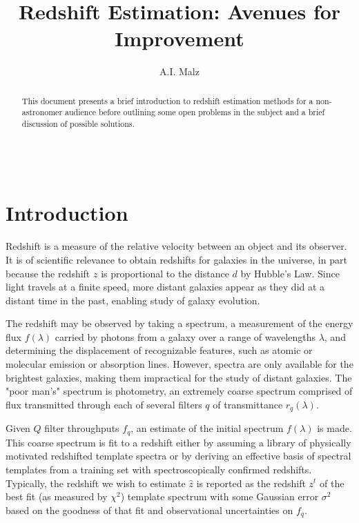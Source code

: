 \documentclass[12pt, onecolumn]{emulateapj}
\begin{document}
\begin{align}
\end{align}

\title{Redshift Estimation: Avenues for Improvement}

\author{A.I. Malz}

\begin{abstract}
This document presents a brief introduction to redshift estimation methods for a non-astronomer audience before outlining some open problems in the subject and a brief discussion of possible solutions.
\end{abstract}


\section{Introduction}
\label{sec:intro}

Redshift is a measure of the relative velocity between an object and its observer.  It is of scientific relevance to obtain redshifts for galaxies in the universe, in part because the redshift $z$ is proportional to the distance $d$ by Hubble's Law.  Since light travels at a finite speed, more distant galaxies appear as they did at a distant time in the past, enabling study of galaxy evolution. 

The redshift may be observed by taking a spectrum, a measurement of the energy flux $f(\lambda)$ carried by photons from a galaxy over a range of wavelengths $\lambda$, and determining the displacement of recognizable features, such as atomic or molecular emission or absorption lines.  However, spectra are only available for the brightest galaxies, making them impractical for the study of distant galaxies.  The "poor man's" spectrum is photometry, an extremely coarse spectrum comprised of flux transmitted through each of several filters $q$ of transmittance $r_{q}(\lambda)$.

Given $Q$ filter throughputs $f_{q}$, an estimate of the initial spectrum $f(\lambda)$ is made.  This coarse spectrum is fit to a redshift either by assuming a library of physically motivated redshifted template spectra or by deriving an effective basis of spectral templates from a training set with spectroscopically confirmed redshifts.  Typically, the redshift we wish to estimate $\hat{z}$ is reported as the redshift $z^{t}$ of the best fit (as measured by $\chi^{2}$) template spectrum with some Gaussian error $\sigma^{2}$ based on the goodness of that fit and observational uncertainties on $f_{q}$.
\end{document}
